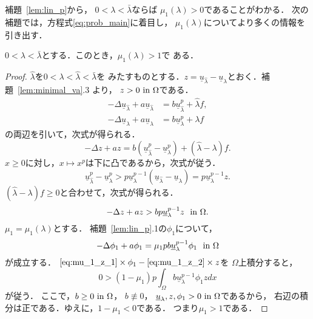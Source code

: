 補題~\ref{lem:lin_p}から，
$0 < \lambda < \bar{\lambda}$ならば
$\mu_1(\lambda) > 0$であることがわかる．
次の補題では，方程式\ref{eq:prob_main}に着目し，
$\mu_1(\lambda)$についてより多くの情報を引き出す．

\begin{lem} \label{lem:lin_1}
 $0 < \lambda < \bar{\lambda}$とする．このとき，$\mu_1(\lambda) > 1$で
 ある．
\end{lem}

\begin{proof}
 $\hat{\lambda}$を$0 < \lambda < \hat{\lambda} < \bar{\lambda}$を
 みたすものとする．$z = \underline{u}_{\hat{\lambda}} -
 \underline{u}_\lambda$とおく．補題~\ref{lem:minimal_va}.3 より，
 $z > 0 ~\text{in}~ \Omega$である．
 \begin{align*}
  -\Delta \underline{u}_{\hat{\lambda}} + a \underline{u}_{\hat{\lambda}} &= b
  \underline{u}_{\hat{\lambda}}^p + \hat{\lambda} f, \\   
  -\Delta \underline{u}_{\lambda} + a \underline{u}_\lambda &= b
  \underline{u}_\lambda^p + \lambda f
 \end{align*}
 の両辺を引いて，次式が得られる．
 \[
  -\Delta z + az = b (\underline{u}_{\hat{\lambda}}^p -
 \underline{u}_\lambda^p)
 + (\hat{\lambda} - \lambda) f.
 \]
 $x \geq 0$に対し，$x \mapsto x^p$は下に凸であるから，次式が従う．
 \[
  \underline{u}_{\hat{\lambda}}^p - \underline{u}_\lambda^p > 
 p \underline{u}_\lambda^{p-1} (\underline{u}_{\hat{\lambda}} -
 \underline{u}_\lambda) = p \underline{u}_\lambda^{p-1} z.
 \]
 $(\hat{\lambda} - \lambda) f \geq 0$と合わせて，次式が得られる．
 \begin{equation}
  -\Delta z + az > bp \underline{u}_\lambda^{p-1} z  \ \ \text{in}~ \Omega.
   \label{eq:mu_1_z_1}
 \end{equation}
 $\mu_1 = \mu_1(\lambda)$とする．
 補題~\ref{lem:lin_p}.1の$\phi_1$について，
 \begin{equation}
  -\Delta \phi_1 + a \phi_1 =
   \mu_1 p b \underline{u}_\lambda^{p-1} \phi_1  \ \ \text{in}~ \Omega
   \label{eq:mu_1_z_2}
 \end{equation}
 が成立する．
 $ \text{\eqref{eq:mu_1_z_1}} \times \phi_1 - 
 \text{\eqref{eq:mu_1_z_2}} \times z$を
 $\Omega$上積分すると，
 \[
  0 > (1 - \mu_1) p \int_\Omega b \underline{u}_\lambda^{p-1} \phi_1 z dx
 \]
 が従う．
 ここで，$b \geq 0 ~\text{in}~ \Omega$，
 $b \not \equiv 0$，
 $\underline{u}_\lambda, z, \phi_1 > 0 ~\text{in}~ \Omega$であるから，
 右辺の積分は正である．ゆえに，$1 - \mu_1 < 0$である．
 つまり$\mu_1 > 1$である． \qedhere
\end{proof}

